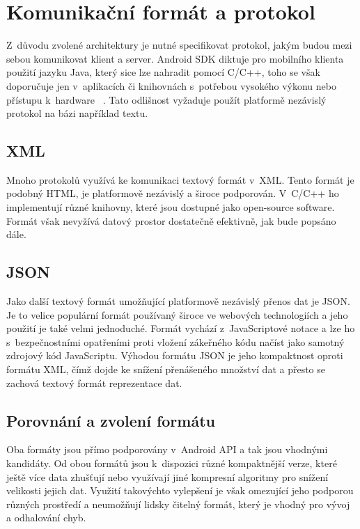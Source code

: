 \documentclass[thesis=B,czech]{FITthesis}[2013/10/20]
\begin{document}
\clearpage


\section{Komunikační formát a protokol}

Z~důvodu zvolené architektury je nutné specifikovat protokol, jakým budou mezi sebou komunikovat klient a server. Android SDK diktuje pro mobilního klienta použití jazyku Java, který sice lze nahradit pomocí C/C++, toho se však doporučuje jen v~aplikacích či knihovnách s~potřebou vysokého výkonu nebo přístupu k~hardware ~\cite{android_ndk}. Tato odlišnost vyžaduje použít platformě nezávislý protokol na bázi například textu.

\subsection{XML}

Mnoho protokolů využívá ke komunikaci textový formát v~XML. Tento formát je podobný HTML, je platformově nezávislý a široce podporován. V~C/C++ ho implementují různé knihovny, které jsou dostupné jako open-source software. Formát však nevyžívá datový prostor dostatečně efektivně, jak bude popsáno dále.

\subsection{JSON}

Jako další textový formát umožňující platformově nezávislý přenos dat je JSON. Je to velice populární formát používaný široce ve webových technologiích a jeho použití je také velmi jednoduché. Formát vychází z~JavaScriptové notace a lze ho s~bezpečnostními opatřeními proti vložení zákeřného kódu načíst jako samotný zdrojový kód JavaScriptu. Výhodou formátu JSON je jeho kompaktnost oproti formátu XML, čímž dojde ke snížení přenášeného množství dat a přesto se zachová textový formát reprezentace dat.

\subsection{Porovnání a zvolení formátu}

Oba formáty jsou přímo podporovány v~Android API a tak jsou vhodnými kandidáty. Od obou formátů jsou k~dispozici různé kompaktnější verze, které ještě více data zhušťují nebo využívají jiné kompresní algoritmy pro snížení velikosti jejich dat. Využití takovýchto vylepšení je však omezující jeho podporou různých prostředí a neumožňují lidsky čitelný formát, který je vhodný pro vývoj a odhalování chyb.
\end{document}
